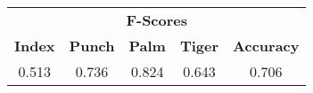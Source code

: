 \documentclass{standalone}
\begin{document}
 
 \begin{tabular}{|c|c|c|c ||c|}
\cline{1-5}\multicolumn{5}{|c|}{\textbf{F-Scores}} \\ 
\cline{1-5}\textbf{Index} & \textbf{Punch} & \textbf{Palm} & \textbf{Tiger} & \textbf{Accuracy}\\ 
\cline{1-5}0.513 & 0.736 & 0.824 & 0.643 & 0.706\\ 
 \cline{1-5}\hline \end{tabular}
 
\end{document}

